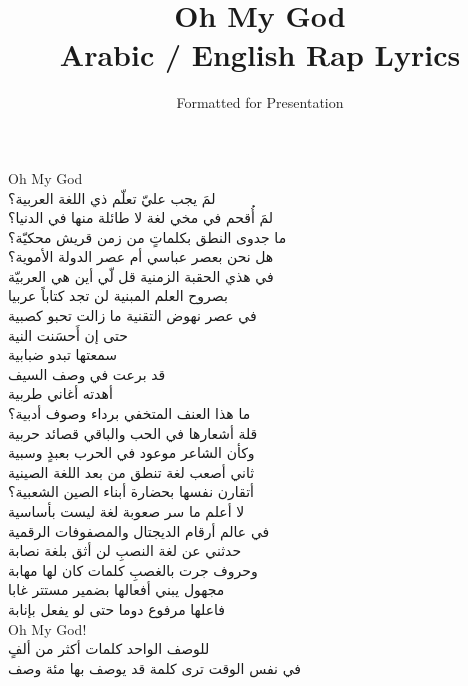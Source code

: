\documentclass[a4paper,12pt]{article}
\begin{document}
\title{\textbf{\Large Oh My God}\\
\large Arabic / English Rap Lyrics}
\author{Formatted for Presentation}
\date{}
\maketitle


\begin{tcolorbox}[colback=boxcolor,colframe=headercolor,title=\textbf{Stanza 1},breakable]
Oh My God \\
\textarabic{
لمَ يجب عليّ تعلّم ذي اللغة العربية؟ \\
لمَ أُقحم في مخي لغة لا طائلة منها في الدنيا؟ \\
ما جدوى النطق بكلماتٍ من زمن قريش محكيّة؟ \\
هل نحن بعصر عباسي أم عصر الدولة الأموية؟ \\
في هذي الحقبة الزمنية قل لّي أين هي العربيّة \\
بصروح العلم المبنية لن تجد كتاباً عربيا \\
في عصر نهوض التقنية ما زالت تحبو كصبية \\
حتى إن أَحسَنت النية \\
سمعتها تبدو ضبابية \\
قد برعت في وصف السيف \\
أهدته أغاني طربية \\
ما هذا العنف المتخفي برداء وصوف أدبية؟ \\
قلة أشعارها في الحب والباقي قصائد حربية \\
وكأن الشاعر موعود في الحرب بعبدٍ وسبية \\
ثاني أصعب لغة تنطق من بعد اللغة الصينية \\
أتقارن نفسها بحضارة أبناء الصين الشعبية؟ \\
لا أعلم ما سر صعوبة لغة ليست بأساسية \\
في عالم أرقام الديجتال والمصفوفات الرقمية \\
حدثني عن لغة النصبِ لن أثق بلغة نصابة \\
وحروف جرت بالغصبِ كلمات كان لها مهابة \\
مجهول يبني أفعالها بضمير مستتر غابا \\
فاعلها مرفوع دوما حتى لو يفعل بإنابة \\
}
Oh My God! \\
\textarabic{
للوصف الواحد كلمات أكثر من ألفٍ \\
في نفس الوقت ترى كلمة قد يوصف بها مئة وصف \\
}
\end{tcolorbox}
\end{document}
